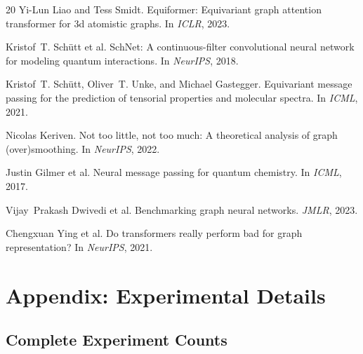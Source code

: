 \documentclass[11pt,a4paper]{article}
\begin{document}
\begin{thebibliography}{20}
Yi-Lun Liao and Tess Smidt.
\newblock Equiformer: Equivariant graph attention transformer for 3d atomistic graphs.
\newblock In \emph{ICLR}, 2023.

Kristof~T. Schütt et al.
\newblock SchNet: A continuous-filter convolutional neural network for modeling quantum interactions.
\newblock In \emph{NeurIPS}, 2018.

Kristof~T. Schütt, Oliver~T. Unke, and Michael Gastegger.
\newblock Equivariant message passing for the prediction of tensorial properties and molecular spectra.
\newblock In \emph{ICML}, 2021.

Nicolas Keriven.
\newblock Not too little, not too much: A theoretical analysis of graph (over)smoothing.
\newblock In \emph{NeurIPS}, 2022.

Justin Gilmer et al.
\newblock Neural message passing for quantum chemistry.
\newblock In \emph{ICML}, 2017.

Vijay~Prakash Dwivedi et al.
\newblock Benchmarking graph neural networks.
\newblock \emph{JMLR}, 2023.

Chengxuan Ying et al.
\newblock Do transformers really perform bad for graph representation?
\newblock In \emph{NeurIPS}, 2021.

\end{thebibliography}

\appendix
\section{Appendix: Experimental Details}

\subsection{Complete Experiment Counts}
\end{document}
